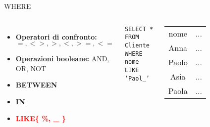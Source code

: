     \begin{frame}{WHERE}
    \begin{columns}[T,onlytextwidth]
    \begin{itemize}
        \item \textbf{Operatori di confronto:} $=, <>, >, <, >=, <=$
        \item \textbf{Operazioni booleane:} AND, OR, NOT
        \item \textbf{BETWEEN}
        \item \textbf{IN}
        \item \textbf{\textcolor{red}{LIKE\{ \%, \_ \}}}
    \end{itemize}
    \vspace{2em}
    \texttt{SELECT * \\FROM Cliente\\WHERE nome LIKE 'Paol\_'}
    \centering
    \begin{table}[h]
    \centering
    \begin{tabular}{|c|c|}
    \hline
    \rowcolor{cyan!30}\multicolumn{2}{|c|}{Cliente} \\
    \hline
    \rowcolor{cyan!30}nome &  ...  \\
    \hline
    Anna &  ... \\
    Paolo &  ...  \\
    Asia &  ...  \\
    Paola &  ...  \\
    \hline
    \end{tabular}
    \end{table}
    \end{columns}
    \end{frame}

